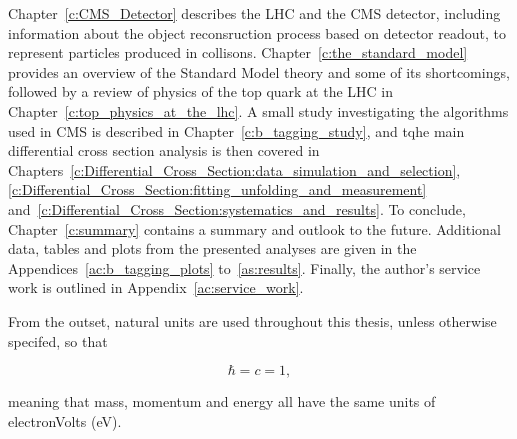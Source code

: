 Chapter~\ref{c:CMS_Detector} describes the LHC and the CMS detector, including information about the object
reconsruction process based on detector readout, to represent particles produced in collisons.
Chapter~\ref{c:the_standard_model} provides an overview of the Standard Model theory and some of its
shortcomings, followed by a review of physics of the top quark at the LHC in
Chapter~\ref{c:top_physics_at_the_lhc}. A small study investigating the \btagging algorithms used in CMS is
described in Chapter~\ref{c:b_tagging_study}, and tqhe main \ttbar differential cross section analysis is then
covered in
Chapters~\ref{c:Differential_Cross_Section:data_simulation_and_selection},\ref{c:Differential_Cross_Section:fitting_unfolding_and_measurement}
and~\ref{c:Differential_Cross_Section:systematics_and_results}. To conclude, Chapter~\ref{c:summary} contains
a summary and outlook to the future. Additional data, tables and plots from the presented analyses are given
in the Appendices~\ref{ac:b_tagging_plots} to~\ref{as:results}. Finally, the author's service work is
outlined in Appendix~\ref{ac:service_work}.

From the outset, natural units are used throughout this thesis, unless otherwise specifed, so that

\begin{equation}
\hbar = c = 1,
\end{equation}

meaning that mass, momentum and energy all have the same units of electronVolts (eV).